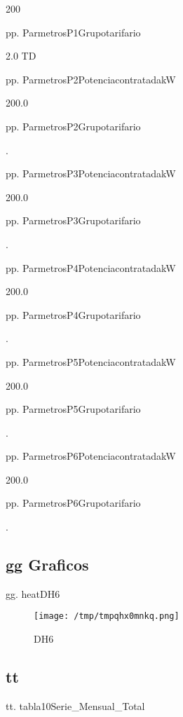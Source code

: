 \documentclass[a4paper,10pt,twocolumn]{article}
\begin{document}
\begin{Form}
200

pp. ParmetrosP1Grupotarifario

2.0 TD

pp. ParmetrosP2PotenciacontratadakW

200.0

pp. ParmetrosP2Grupotarifario

.

pp. ParmetrosP3PotenciacontratadakW

200.0

pp. ParmetrosP3Grupotarifario

.

pp. ParmetrosP4PotenciacontratadakW

200.0

pp. ParmetrosP4Grupotarifario

.

pp. ParmetrosP5PotenciacontratadakW

200.0

pp. ParmetrosP5Grupotarifario

.

pp. ParmetrosP6PotenciacontratadakW

200.0

pp. ParmetrosP6Grupotarifario

.
\newpage 
\subsection{gg Graficos}

gg. heatDH6

\begin{figure}[H] \centering
                    
                    \texttt{[image: /tmp/tmpqhx0mnkq.png]}
                    \caption{DH6}
                    
                    \label{fig:dfassssdfsa}
                    \end{figure}
                    
\newpage 
\subsection{tt}

tt. tabla10Serie_Mensual_Total



\end{Form}
\end{document}
